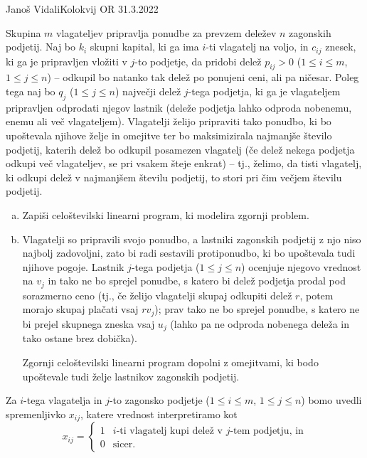 \begin{naloga}{Janoš Vidali}{Kolokvij OR 31.3.2022}
\begin{vprasanje}
Skupina $m$ vlagateljev pripravlja ponudbe
za prevzem deležev $n$ zagonskih podjetij.
Naj bo $k_i$ skupni kapital, ki ga ima $i$-ti vlagatelj na voljo,
in $c_{ij}$ znesek, ki ga je pripravljen vložiti v $j$-to podjetje,
da pridobi delež $p_{ij} > 0$ ($1 \le i \le m$, $1 \le j \le n$)
-- odkupil bo natanko tak delež po ponujeni ceni, ali pa ničesar.
Poleg tega naj bo $q_j$ ($1 \le j \le n$) največji delež $j$-tega podjetja,
ki ga je vlagateljem pripravljen odprodati njegov lastnik
(deleže podjetja lahko odproda nobenemu, enemu ali več vlagateljem).
Vlagatelji želijo pripraviti tako ponudbo,
ki bo upoštevala njihove želje in omejitve
ter bo maksimizirala najmanjše število podjetij,
katerih delež bo odkupil posamezen vlagatelj
(če delež nekega podjetja odkupi več vlagateljev,
se pri vsakem šteje enkrat)
-- tj., želimo, da tisti vlagatelj,
ki odkupi delež v najmanjšem številu podjetij,
to stori pri čim večjem številu podjetij.

\begin{enumerate}[(a)]
\item Zapiši celoštevilski linearni program, ki modelira zgornji problem.

\item Vlagatelji so pripravili svojo ponudbo,
a lastniki zagonskih podjetij z njo niso najbolj zadovoljni,
zato bi radi sestavili protiponudbo, ki bo upoštevala tudi njihove pogoje.
Lastnik $j$-tega podjetja ($1 \le j \le n$)
ocenjuje njegovo vrednost na $v_j$ in tako ne bo sprejel ponudbe,
s katero bi delež podjetja prodal pod sorazmerno ceno
(tj., če želijo vlagatelji skupaj odkupiti delež $r$,
potem morajo skupaj plačati vsaj $r v_j$);
prav tako ne bo sprejel ponudbe,
s katero ne bi prejel skupnega zneska vsaj $u_j$
(lahko pa ne odproda nobenega deleža in tako ostane brez dobička).

Zgornji celoštevilski linearni program dopolni z omejitvami,
ki bodo upoštevale tudi želje last\-ni\-kov zagonskih podjetij.
\end{enumerate}
\end{vprasanje}

\begin{odgovor}
Za $i$-tega vlagatelja in $j$-to zagonsko podjetje
($1 \le i \le m$, $1 \le j \le n$)
bomo uvedli spremenljivko $x_{ij}$,
katere vrednost interpretiramo kot
$$
x_{ij} = \begin{cases}
1 & \text{$i$-ti vlagatelj kupi delež v $j$-tem podjetju, in} \\
0 & \text{sicer.}
\end{cases}
$$


\end{odgovor}
\end{naloga}
